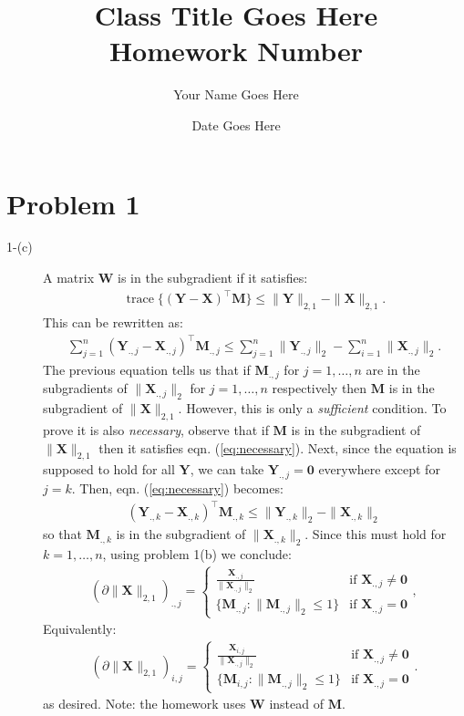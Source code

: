 \documentclass[11pt,onside]{article}
\title{\blue Class Title Goes Here \\
\blueb Homework Number}
\author{Your Name Goes Here}
\date{Date Goes Here} %
\DeclareMathOperator{\trace}{trace}
\begin{document}
\maketitle

\section{Problem 1}
\begin{description}
\item[1-(c)] A matrix $\bm{W}$ is in the subgradient if it satisfies:
\begin{align*}
\trace\{(\bm{Y}-\bm{X})^\top\bm{M}\}\leq \|\bm{Y}\|_{2,1}-\|\bm{X}\|_{2,1}.
\end{align*}
This can be rewritten as:
\begin{align}
\label{eq:necessary}
\sum_{j=1}^n(\bm{Y}_{.,j}-\bm{X}_{.,j})^\top\bm{M}_{.,j}\leq \sum_{j=1}^n\|\bm{Y}_{.,j}\|_2-\sum_{i=1}^n\|\bm{X}_{.,j}\|_2.
\end{align}
The previous equation tells us that if $\bm{M}_{.,j}$ for $j=1,\dots,n$ are in the subgradients of $\|\bm{X}_{.,j}\|_2$ for $j=1,\dots,n$ respectively then $\bm{M}$ is in the subgradient of $\|\bm{X}\|_{2,1}$. However, this is only a {\it{sufficient}} condition. To prove it is also {\it{necessary}}, observe that if $\bm{M}$ is in the subgradient of $\|\bm{X}\|_{2,1}$ then it satisfies eqn. (\ref{eq:necessary}). Next, since the equation is supposed to hold for all $\bm{Y}$, we can take $\bm{Y}_{.,j}=\bm{0}$ everywhere except for $j=k$. Then, eqn. (\ref{eq:necessary}) becomes:
\begin{align*}
(\bm{Y}_{.,k}-\bm{X}_{.,k})^\top\bm{M}_{.,k}\leq \|\bm{Y}_{.,k}\|_2-\|\bm{X}_{.,k}\|_2
\end{align*}
so that $\bm{M}_{.,k}$ is in the subgradient of $\|\bm{X}_{.,k}\|_2$. Since this must hold for $k=1,\dots,n$, using problem 1(b) we conclude:
\begin{align*}
(\partial\|\bm{X}\|_{2,1})_{.,j}=\begin{cases} \frac{\bm{X}_{.,j}}{\|\bm{X}_{.,j}\|_2} &\mbox{if } \bm{X}_{.,j}\neq \bm{0} \\
\{\bm{M}_{.,j}:\|\bm{M}_{.,j}\|_2\leq 1\} & \mbox{if } \bm{X}_{.,j}=\bm{0} \end{cases},
\end{align*}
Equivalently:
\begin{align*}
(\partial\|\bm{X}\|_{2,1})_{i,j}=\begin{cases} \frac{\bm{X}_{i,j}}{\|\bm{X}_{.,j}\|_2} &\mbox{if } \bm{X}_{.,j}\neq \bm{0} \\
\{\bm{M}_{i,j}:\|\bm{M}_{.,j}\|_2\leq 1\} & \mbox{if } \bm{X}_{.,j}=\bm{0} \end{cases}.
\end{align*}
as desired. Note: the homework uses $\bm{W}$ instead of $\bm{M}$.\\


\end{description}
\end{document}
